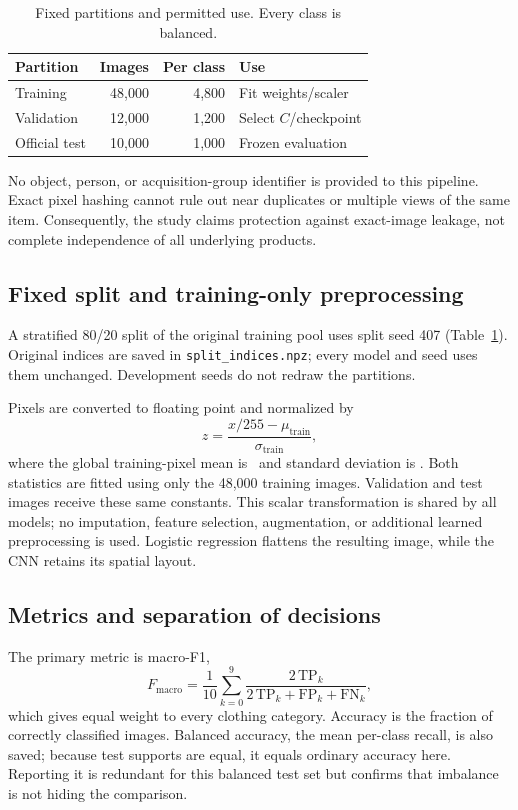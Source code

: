 \documentclass[conference]{IEEEtran}
\begin{document}
\begin{table}[t]
\caption{Fixed partitions and permitted use. Every class is balanced.}
\label{tab:partitions}
\centering
\begin{tabular}{lrrl}
\toprule Partition & Images & Per class & Use \\
\midrule Training & 48,000 & 4,800 & Fit weights/scaler \\
Validation & 12,000 & 1,200 & Select $C$/checkpoint \\
Official test & 10,000 & 1,000 & Frozen evaluation \\
\bottomrule
\end{tabular}
\end{table}

No object, person, or acquisition-group identifier is provided to this pipeline. Exact pixel hashing cannot rule out near duplicates or multiple views of the same item. Consequently, the study claims protection against exact-image leakage, not complete independence of all underlying products.

\subsection{Fixed split and training-only preprocessing}
A stratified 80/20 split of the original training pool uses split seed 407 (Table~\ref{tab:partitions}). Original indices are saved in \texttt{split\_indices.npz}; every model and seed uses them unchanged. Development seeds do not redraw the partitions.

Pixels are converted to floating point and normalized by
\begin{equation}
 z=\frac{x/255-\mu_{\mathrm{train}}}{\sigma_{\mathrm{train}}},
\end{equation}
where the global training-pixel mean is \NormMean\ and standard deviation is \NormSD. Both statistics are fitted using only the 48,000 training images. Validation and test images receive these same constants. This scalar transformation is shared by all models; no imputation, feature selection, augmentation, or additional learned preprocessing is used. Logistic regression flattens the resulting image, while the CNN retains its spatial layout.

\subsection{Metrics and separation of decisions}
The primary metric is macro-F1,
\begin{equation}
 F_{\mathrm{macro}}=\frac{1}{10}\sum_{k=0}^{9}
 \frac{2\,\mathrm{TP}_k}{2\,\mathrm{TP}_k+\mathrm{FP}_k+\mathrm{FN}_k},
\end{equation}
which gives equal weight to every clothing category. Accuracy is the fraction of correctly classified images. Balanced accuracy, the mean per-class recall, is also saved; because test supports are equal, it equals ordinary accuracy here. Reporting it is redundant for this balanced test set but confirms that imbalance is not hiding the comparison.
\end{document}

